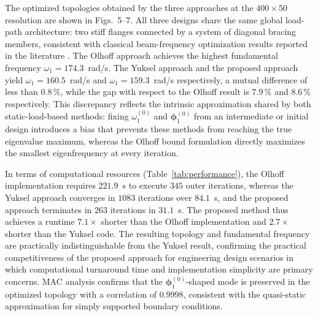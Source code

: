 \documentclass[pdflatex,lineno,sn-mathphys-ay]{sn-jnl}
\begin{document}
The optimized topologies obtained by the three approaches at the $400{\times}50$ resolution are shown in Figs.~5--7.  All three designs share the same global load-path architecture: two stiff flanges connected by a system of diagonal bracing members, consistent with classical beam-frequency optimization results reported in the literature \citep{Du2007,Yuksel2025}.  The Olhoff
approach achieves the highest fundamental frequency $\omega_1 = 174.3$~rad/s.  The Yuksel approach and the proposed approach yield $\omega_1 = 160.5$~rad/s and $\omega_1 = 159.3$~rad/s respectively, a mutual difference of less than $0.8\,\%$, while the gap with respect to the Olhoff result is $7.9\,\%$ and $8.6\,\%$ respectively.  This discrepancy reflects the intrinsic approximation shared by both static-load-based methods:
fixing $\omega_1^{(0)}$ and $\boldsymbol{\phi}_1^{(0)}$ from an intermediate or initial design introduces a bias that prevents these methods from reaching the true eigenvalue maximum, whereas the Olhoff bound formulation directly maximizes the smallest eigenfrequency at every iteration.  

In terms of computational resources (Table~\ref{tab:performance}), the Olhoff implementation requires $221.9$~s to execute $345$ outer iterations, whereas the Yuksel approach converges in $1083$ iterations over $84.1$~s, and the proposed approach terminates in $263$ iterations in $31.1$~s.  The proposed method thus achieves a runtime $7.1\times$ shorter than the Olhoff implementation and $2.7\times$ shorter than the Yuksel code. The resulting topology and fundamental frequency are practically indistinguishable from the Yuksel result, confirming the practical competitiveness of the proposed approach for engineering design scenarios in which computational turnaround time and implementation simplicity are primary concerns. MAC analysis confirms that the $\boldsymbol{\phi}_1^{(0)}$-shaped mode is preserved in the optimized topology with a correlation of $0.9998$, consistent with the quasi-static approximation for simply supported boundary conditions.
\end{document}
